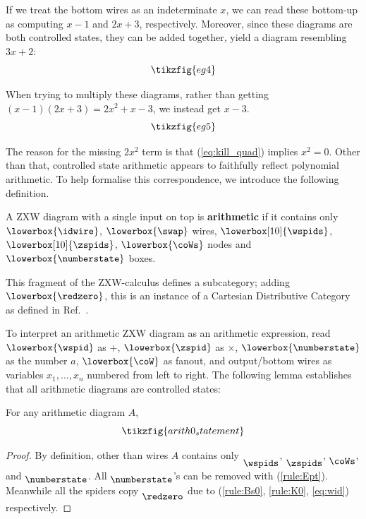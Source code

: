 If we treat the bottom wires as an indeterminate $x$, we can read these bottom-up as computing $x - 1$ and $2x + 3$, respectively. Moreover, since these diagrams are both controlled states, they can be added together,  yield a diagram resembling $3x + 2$:
\begin{equation}
    \tikzfig{eg4}
\end{equation}

When trying to multiply these diagrams, rather than getting $(x-1)(2x+3) = 2x^2 + x - 3$, we instead get $x - 3$.
\begin{equation}
    \tikzfig{eg5}
\end{equation}

The reason for the missing $2x^2$ term is that (\ref{eq:kill_quad}) implies $x^2 = 0$. Other than that, controlled state arithmetic appears to faithfully reflect polynomial arithmetic. To help formalise this correspondence, we introduce the following definition.

\begin{definition}
    A ZXW diagram with a single input on top is \textbf{arithmetic} if it contains only  $\lowerbox{\idwire}$, $\lowerbox{\swap}$ wires, $\lowerbox[10]{\wspids}$, $\lowerbox[10]{\zspids}$, $\lowerbox{\coWs}$ nodes and $\lowerbox{\numberstate}$ boxes.
\end{definition}
\begin{remark}
    This fragment of the ZXW-calculus defines a subcategory; adding $\lowerbox{\redzero}$, this is an instance of a Cartesian Distributive Category as defined in Ref.~\cite{wilson2023diffpolycirc}.
\end{remark}

To interpret an arithmetic ZXW diagram as an arithmetic expression, read $\lowerbox{\wspid}$ as $+$, $\lowerbox{\zspid}$ as $\times$, $\lowerbox{\numberstate}$ as the number $a$, $\lowerbox{\coW}$ as fanout, and output/bottom wires as variables $x_1, ..., x_n$ numbered from left to right. The following lemma establishes that all arithmetic diagrams are controlled states:
\begin{lemma}
    For any arithmetic diagram $A$, \begin{equation}\label{eq:arith_cs}
        \tikzfig{arith0_statement}
    \end{equation}
\end{lemma}
\begin{proof}
    By definition, other than wires $A$ contains only $\raisebox{-7pt}{\wspids}$, $\raisebox{-7pt}{\zspids}$, $\raisebox{-5pt}{\coWs}$, and $\raisebox{-3pt}{\numberstate}$. All $\raisebox{-3pt}{\numberstate}$'s can be removed with (\ref{rule:Ept}). Meanwhile all the spiders copy $\raisebox{-5pt}{\redzero}$ due to (\ref{rule:Bs0}, \ref{rule:K0}, \ref{eq:wid}) respectively.
\end{proof}

